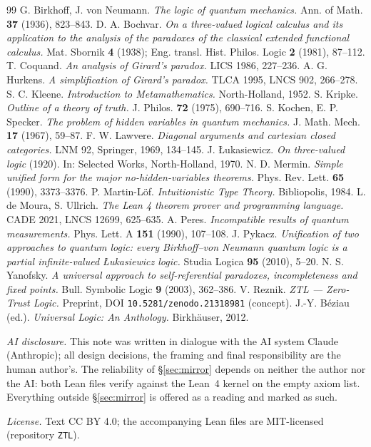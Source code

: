 \documentclass[11pt]{article}
\theoremstyle{remark}
\begin{document}
\begin{thebibliography}{99}
 G. Birkhoff, J. von Neumann. \emph{The logic of quantum
mechanics.} Ann. of Math. \textbf{37} (1936), 823--843.
 D. A. Bochvar. \emph{On a three-valued logical calculus and
its application to the analysis of the paradoxes of the classical extended
functional calculus.} Mat. Sbornik \textbf{4} (1938); Eng. transl. Hist.
Philos. Logic \textbf{2} (1981), 87--112.
 T. Coquand. \emph{An analysis of Girard's paradox.} LICS
1986, 227--236.
 A. G. Hurkens. \emph{A simplification of Girard's paradox.}
TLCA 1995, LNCS 902, 266--278.
 S. C. Kleene. \emph{Introduction to Metamathematics.}
North-Holland, 1952.
 S. Kripke. \emph{Outline of a theory of truth.} J. Philos.
\textbf{72} (1975), 690--716.
 S. Kochen, E. P. Specker. \emph{The problem of hidden
variables in quantum mechanics.} J. Math. Mech. \textbf{17} (1967), 59--87.
 F. W. Lawvere. \emph{Diagonal arguments and cartesian closed
categories.} LNM 92, Springer, 1969, 134--145.
 J. \L ukasiewicz. \emph{On three-valued logic} (1920).
In: Selected Works, North-Holland, 1970.
 N. D. Mermin. \emph{Simple unified form for the major
no-hidden-variables theorems.} Phys. Rev. Lett. \textbf{65} (1990),
3373--3376.
 P. Martin-L\"of. \emph{Intuitionistic Type Theory.} Bibliopolis,
1984.
 L. de Moura, S. Ullrich. \emph{The Lean 4 theorem prover and
programming language.} CADE 2021, LNCS 12699, 625--635.
 A. Peres. \emph{Incompatible results of quantum
measurements.} Phys. Lett. A \textbf{151} (1990), 107--108.
 J. Pykacz. \emph{Unification of two approaches to quantum
logic: every Birkhoff--von Neumann quantum logic is a partial infinite-valued
{\L}ukasiewicz logic.} Studia Logica \textbf{95} (2010), 5--20.
 N. S. Yanofsky. \emph{A universal approach to
self-referential paradoxes, incompleteness and fixed points.} Bull. Symbolic
Logic \textbf{9} (2003), 362--386.
 V. Reznik. \emph{ZTL --- Zero-Trust Logic.} Preprint, DOI
\texttt{10.5281/zenodo.21318981} (concept).
 J.-Y. B\'eziau (ed.). \emph{Universal Logic: An Anthology.}
Birkh\"auser, 2012.
\end{thebibliography}

\vspace{1em}
\noindent\emph{AI disclosure.} This note was written in dialogue with the AI
system Claude (Anthropic); all design decisions, the framing and final
responsibility are the human author's. The reliability of \S\ref{sec:mirror}
depends on neither the author nor the AI: both Lean files verify against the
Lean~4 kernel on the empty axiom list. Everything outside \S\ref{sec:mirror}
is offered as a reading and marked as such.

\smallskip
\noindent\emph{License.} Text CC BY 4.0; the accompanying Lean files are
MIT-licensed (repository \texttt{ZTL}).
\end{document}
